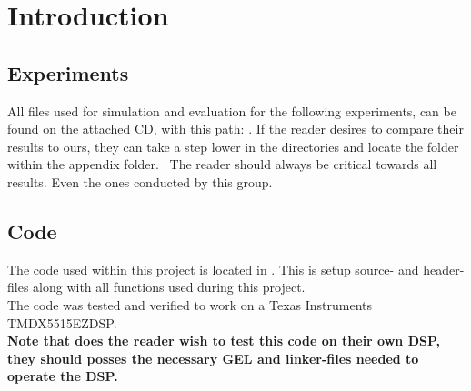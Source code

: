 \section{Introduction}
\subsection{Experiments}
All files used for simulation and evaluation for the following experiments, can be found on the attached CD, with this path: . If the reader desires to compare their results to ours, they can take a step lower in the directories and locate the folder  within the appendix folder. \
The reader should always be critical towards all results. Even the ones conducted by this group.

\subsection{Code}
The code used within this project is located in . This is setup source- and header-files along with all functions used during this project.\\
The code was tested and verified to work on a Texas Instruments TMDX5515EZDSP. \\

\textbf{Note that does the reader wish to test this code on their own DSP, they should posses the necessary GEL and linker-files needed to operate the DSP.}